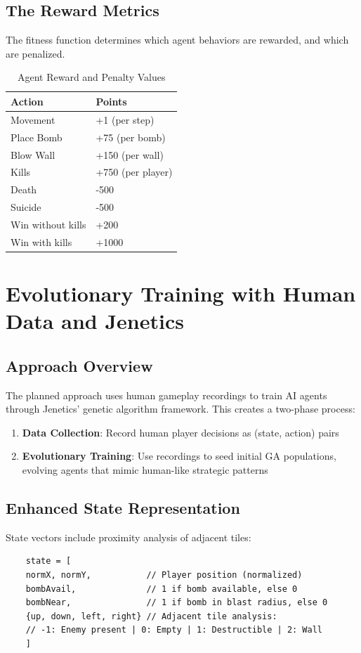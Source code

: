 \documentclass[sigconf]{acmart} %
\begin{document}
\subsection{The Reward Metrics}
The fitness function determines which agent behaviors are rewarded, and which are penalized.
\begin{table}[htbp]
\centering

\caption{Agent Reward and Penalty Values}

\begin{tabular}{l|l}
\textbf{Action} & \textbf{Points}  \\
\hline
Movement & +1 (per step) \\
\hline
Place Bomb & +75 (per bomb) \\
\hline
Blow Wall & +150 (per wall) \\
\hline
Kills & +750 (per player) \\
\hline
Death  & -500  \\
\hline
Suicide & -500 \\
\hline
Win without kills & +200  \\
\hline
Win with kills & +1000  \\
\hline
\end{tabular}
\end{table}


\section{Evolutionary Training with Human Data and Jenetics}

\subsection{Approach Overview}
The planned approach uses human gameplay recordings to train AI agents through Jenetics' genetic algorithm framework. This creates a two-phase process:
\begin{enumerate}
	\item \textbf{Data Collection}: Record human player decisions as (state, action) pairs
	\item \textbf{Evolutionary Training}: Use recordings to seed initial GA populations, evolving agents that mimic human-like strategic patterns
\end{enumerate}

\subsection{Enhanced State Representation}
State vectors include proximity analysis of adjacent tiles:
\begin{verbatim}
	state = [
	normX, normY,           // Player position (normalized)
	bombAvail,              // 1 if bomb available, else 0
	bombNear,               // 1 if bomb in blast radius, else 0
	{up, down, left, right} // Adjacent tile analysis:
	// -1: Enemy present | 0: Empty | 1: Destructible | 2: Wall
	]
\end{verbatim}
\end{document}
